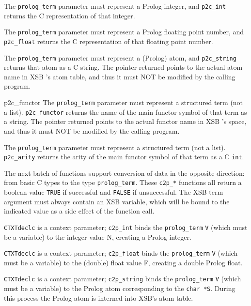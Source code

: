 \begin{description}
%
The {\tt prolog\_term} parameter must represent a Prolog integer, and
{\tt p2c\_int} returns the C representation of that integer.

%
The {\tt prolog\_term} parameter must represent a Prolog floating point
number, and {\tt p2c\_float} returns the C representation of
that floating point number.

%
The {\tt prolog\_term} parameter must represent a (Prolog) atom, and
{\tt p2c\_string} returns that atom as a C string. The pointer
returned points to the actual atom name in XSB 's atom table, and thus
it must NOT be modified by the calling program.

 {p2c\_functor}
%
The {\tt prolog\_term} parameter must represent a structured term (not a
list).  {\tt p2c\_functor} returns the name of the main
functor symbol of that term as a string. The pointer returned points
to the actual functor name in XSB 's space, and thus it must NOT be
modified by the calling program.

%
The {\tt prolog\_term} parameter must represent a structured term (not
a list).  {\tt p2c\_arity} returns the arity of the main
functor symbol of that term as a C {\tt int}.
\end{description}

The next batch of functions support conversion of data in the opposite
direction: from basic C types to the type {\tt prolog\_term}.  These
{\tt c2p\_*} functions all return a boolean value {\tt TRUE}
if successful and {\tt FALSE} if unsuccessful.  The XSB term argument
must always contain an XSB variable, which will be bound to the
indicated value as a side effect of the function call.

\begin{description}
%
 {\tt CTXTdeclc} is a context parameter; {\tt c2p\_int} binds the
 {\tt prolog\_term} {\tt V} (which must be a variable) to the integer
 value N, creating a Prolog integer.

%
 {\tt CTXTdeclc} is a context parameter; {\tt c2p\_float} binds the
 {\tt prolog\_term} {\tt V} (which must be a variable) to the (double)
 float value F, creating a double Prolog float.

%
 {\tt CTXTdeclc} is a context parameter; {\tt c2p\_string} binds the
 {\tt prolog\_term} {\tt V} (which must be a variable) to the Prolog
 atom corresponding to the {\tt char *S}.  During this process the
 Prolog atom is interned into XSB's atom table.
\end{description}

